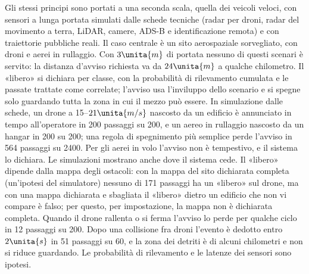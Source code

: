 Gli stessi principi sono portati a una seconda scala, quella dei veicoli veloci, con sensori a lunga portata simulati dalle schede tecniche (radar per droni, radar del movimento a terra, LiDAR, camere, ADS-B e identificazione remota) e con traiettorie pubbliche reali. Il caso centrale è un sito aerospaziale sorvegliato, con droni e aerei in rullaggio. Con $3\unita{m}$ di portata nessuno di questi scenari è servito: la distanza d'avviso richiesta va da $24\unita{m}$ a qualche chilometro. Il «libero» si dichiara per classe, con la probabilità di rilevamento cumulata e le passate trattate come correlate; l'avviso usa l'inviluppo dello scenario e si spegne solo guardando tutta la zona in cui il mezzo può essere. In simulazione dalle schede, un drone a 15--$21\unita{m/s}$ nascosto da un edificio è annunciato in tempo all'operatore in 200 passaggi su 200, e un aereo in rullaggio nascosto da un hangar in 200 su 200; una regola di spegnimento più semplice perde l'avviso in 564 passaggi su 2400. Per gli aerei in volo l'avviso non è tempestivo, e il sistema lo dichiara.
Le simulazioni mostrano anche dove il sistema cede. Il «libero» dipende dalla mappa degli ostacoli: con la mappa del sito dichiarata completa (un'ipotesi del simulatore) nessuno di 171 passaggi ha un «libero» sul drone, ma con una mappa dichiarata e sbagliata il «libero» dietro un edificio che non vi compare è falso; per questo, per impostazione, la mappa non è dichiarata completa. Quando il drone rallenta o si ferma l'avviso lo perde per qualche ciclo in 12 passaggi su 200. Dopo una collisione fra droni l'evento è dedotto entro $2\unita{s}$ in 51 passaggi su 60, e la zona dei detriti è di alcuni chilometri e non si riduce guardando. Le probabilità di rilevamento e le latenze dei sensori sono ipotesi.
